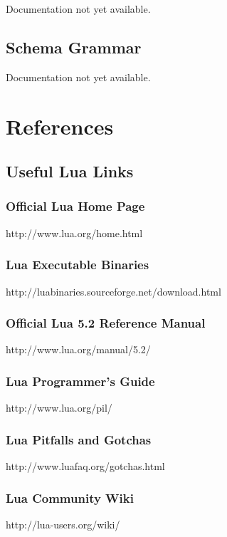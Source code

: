 \documentclass[11pt]{article}
\begin{document}
Documentation not yet available.

\subsection{Schema Grammar}

Documentation not yet available.

\section{References}

\subsection{Useful Lua Links}

\subsubsection{Official Lua Home Page}

http://www.lua.org/home.html

\subsubsection{Lua Executable Binaries}

http://luabinaries.sourceforge.net/download.html

\subsubsection{Official Lua 5.2 Reference Manual}

http://www.lua.org/manual/5.2/

\subsubsection{Lua Programmer's Guide}

http://www.lua.org/pil/

\subsubsection{Lua Pitfalls and Gotchas}

http://www.luafaq.org/gotchas.html

\subsubsection{Lua Community Wiki}

http://lua-users.org/wiki/

\end{document}
